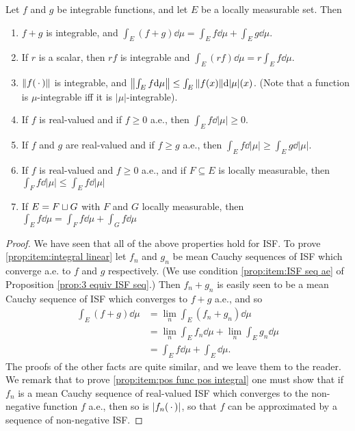 \begin{proposition}
Let $f$ and $g$ be integrable functions, and let $E$ be a locally measurable set. Then
\begin{enumerate}
    \item \label{prop:item:integral linear}
    $f+g$ is integrable, and $\int_E(f+g)\dd\mu=\int_Ef\dd\mu+\int_Eg\dd\mu$.

    \item \label{prop:item:integral homogeneity}
    If $r$ is a scalar, then $rf$ is integrable and $\int_E(rf)\dd\mu=r\int_Ef\dd\mu$.

    \item $\norm{f(\,\cdot\,)}$ is integrable, and $\norm{\int_Ef\dd\mu}\leq\int_E\norm{f(x)}\dd|\mu|(x)$. (Note that a function is $\mu$-integrable iff it is $|\mu|$-integrable).

    \item \label{prop:item:pos func pos integral}
    If $f$ is real-valued and if $f\geq0$ a.e., then $\int_Ef\dd|\mu|\geq0$.

    \item \label{prop:item:integral preserve order}
    If $f$ and $g$ are real-valued and if $f\geq g$ a.e., then $\int_Ef\dd|\mu|\geq\int_Eg\dd|\mu|$.

    \item If $f$ is real-valued and $f\geq0$ a.e., and if $F\subseteq E$ is locally measurable, then $\int_Ff\dd|\mu|\leq\int_Ef\dd|\mu|$

    \item \label{prop:item:integral on disjoint sets}
    If $E=F\sqcup G$ with $F$ and $G$ locally measurable, then $\int_Ef\dd\mu=\int_Ff\dd\mu+\int_Gf\dd\mu$
\end{enumerate}
\end{proposition}

\begin{proof}
We have seen that all of the above properties hold for ISF. To prove \ref{prop:item:integral linear} let $f_n$ and $g_n$ be mean Cauchy sequences of ISF which converge a.e. to $f$ and $g$ respectively. (We use condition \ref{prop:item:ISF seq ae} of Proposition \ref{prop:3 equiv ISF seq}.) Then $f_n+g_n$ is easily seen to be a mean Cauchy sequence of ISF which converges to $f+g$ a.e., and so
\begin{align*}
    \int_E(f+g)\dd\mu&=\lim_n\int_E(f_n+g_n)\dd\mu\\
    &=\lim_n\int_Ef_n\dd\mu+\lim_n\int_Eg_n\dd\mu\\
    &=\int_Ef\dd\mu+\int_E\dd\mu.
\end{align*}
The proofs of the other facts are quite similar, and we leave them to the reader. We remark that to prove \ref{prop:item:pos func pos integral} one must show that if $f_n$ is a mean Cauchy sequence of real-valued ISF which converges to the non-negative function $f$ a.e., then so is $|f_n(\,\cdot\,)|$, so that $f$ can be approximated by a sequence of non-negative ISF.
\end{proof}

